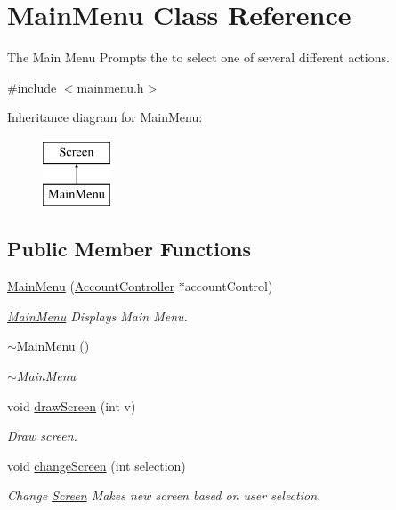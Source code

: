 \hypertarget{classMainMenu}{}\section{Main\+Menu Class Reference}
\label{classMainMenu}


The Main Menu Prompts the to select one of several different actions.  




{\ttfamily \#include $<$mainmenu.\+h$>$}

Inheritance diagram for Main\+Menu\+:\begin{figure}[H]
\begin{center}
\leavevmode
\includegraphics[height=2.000000cm]{classMainMenu}
\end{center}
\end{figure}
\subsection*{Public Member Functions}
\begin{DoxyCompactItemize}
\item 
\hyperlink{classMainMenu_a59fd6b4194b456791c0f17d223e37bea}{Main\+Menu} (\hyperlink{classAccountController}{Account\+Controller} $\ast$account\+Control)
\begin{DoxyCompactList}\small\item\em \hyperlink{classMainMenu}{Main\+Menu} Displays Main Menu. \end{DoxyCompactList}\item 
\hyperlink{classMainMenu_a0a19ddba3ac52bf39c09b579171c98f2}{$\sim$\+Main\+Menu} ()\hypertarget{classMainMenu_a0a19ddba3ac52bf39c09b579171c98f2}{}\label{classMainMenu_a0a19ddba3ac52bf39c09b579171c98f2}

\begin{DoxyCompactList}\small\item\em $\sim$\+Main\+Menu \end{DoxyCompactList}\item 
void \hyperlink{classMainMenu_ae86dc04cf1ae13a6041ffbd7212e5421}{draw\+Screen} (int v)
\begin{DoxyCompactList}\small\item\em Draw screen. \end{DoxyCompactList}\item 
void \hyperlink{classMainMenu_ab91c57315336821b94bd1240550183a4}{change\+Screen} (int selection)
\begin{DoxyCompactList}\small\item\em Change \hyperlink{classScreen}{Screen} Makes new screen based on user selection. \end{DoxyCompactList}\end{DoxyCompactItemize}
